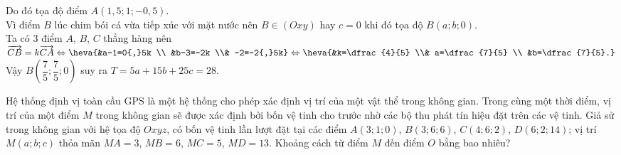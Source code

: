 \begin{bt}
{		Do đó tọa độ điểm $A(1,5;1;-0,5)$.\\ 
		Vì điểm $B$ lúc chim bói cá vừa tiếp  xúc với mặt nước nên $B\in(Oxy)$ hay $c=0$ khi đó tọa độ $B(a;b;0)$.\\
		Ta có $3$ điểm $A$, $B$, $C$ thẳng hàng nên $\overrightarrow{CB}=k\overrightarrow{CA}\Leftrightarrow\heva{&a-1=0{,}5k \\ &b-3=-2k \\& -2=-2{,}5k}\Leftrightarrow\heva{&k=\dfrac{4}{5} \\&  a=\dfrac{7}{5} \\ &b=\dfrac{7}{5}.}$\\
		 Vậy $B\left(\dfrac{7}{5};\dfrac{7}{5};0\right)$ suy ra $T=5a+15b+25c=28$.
	 }
\end{bt}

\begin{bt}%
	Hệ thống định vị toàn cầu GPS là một hệ thống cho phép xác định vị trí của một vật thể trong không gian. Trong cùng một thời điểm, vị trí của một điểm $M$ trong không gian sẽ được xác định bởi bốn vệ tinh cho trước nhờ các bộ thu phát tín hiệu đặt trên các vệ tinh. Giả sử trong không gian với hệ tọa độ $Oxyz$, có bốn vệ tinh lần  lượt đặt tại các điểm $A(3;1;0)$, $B(3;6;6)$, $C(4;6;2)$, $D(6;2;14)$; vị trí $M(a;b;c)$ thỏa mãn $MA=3$, $MB=6$, $MC=5$, $MD=13$. Khoảng cách từ điểm $M$ đến điểm $O$ bằng bao nhiêu?
\end{bt}

